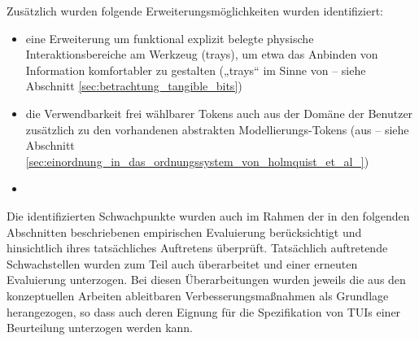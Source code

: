 Zusätzlich wurden folgende Erweiterungsmöglichkeiten wurden identifiziert:
\begin{itemize}
	\item eine Erweiterung um funktional explizit belegte physische Interaktionsbereiche am Werkzeug (trays), um etwa das Anbinden von Information komfortabler zu gestalten („trays“ im Sinne von \citep{Ishii97} -- siehe Abschnitt \ref{sec:betrachtung_tangible_bits})
	\item die Verwendbarkeit frei wählbarer Tokens auch aus der Domäne der Benutzer zusätzlich zu den vorhandenen abstrakten Modellierungs-Tokens (aus \citep{Holmquist99} -- siehe Abschnitt \ref{sec:einordnung_in_das_ordnungssystem_von_holmquist_et_al_})
	\item 
\end{itemize}

Die identifizierten Schwachpunkte wurden auch im Rahmen der in den folgenden Abschnitten beschriebenen empirischen Evaluierung berücksichtigt und hinsichtlich ihres tatsächliches Auftretens überprüft. Tatsächlich auftretende Schwachstellen wurden zum Teil auch überarbeitet und einer erneuten Evaluierung unterzogen. Bei diesen Überarbeitungen wurden jeweils die aus den konzeptuellen Arbeiten ableitbaren Verbesserungsmaßnahmen als Grundlage herangezogen, so dass auch deren Eignung für die Spezifikation von \glspl{TUI} einer Beurteilung unterzogen werden kann.



